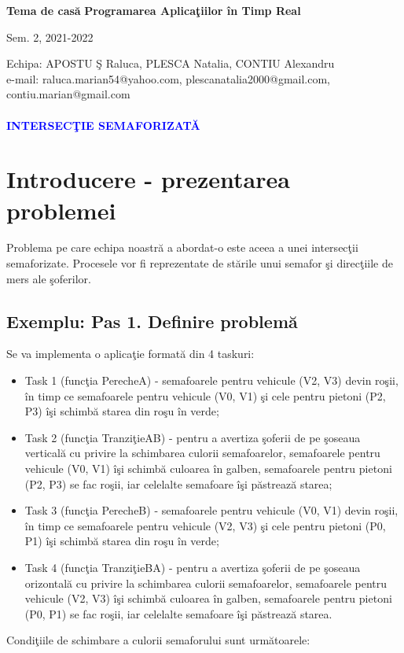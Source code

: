 \documentclass[a4paper, 11pt]{article}
\begin{document}
\noindent
\large\textbf{Tema de cas\u{a}} \hfill \textbf{Programarea Aplica\c{t}iilor \^{i}n Timp Real} 
\begin{flushright} Sem. 2, 2021-2022 \end{flushright} 
\hfill \break
\normalsize Echipa: APOSTU \c{S} Raluca, \space\space\space\space PLESCA Natalia, \space\space\space\space\space CONTIU Alexandru\\
\normalsize e-mail: \space raluca.marian54@yahoo.com, plescanatalia2000@gmail.com, contiu.marian@gmail.com\\
\\
\large\textbf{\textcolor{blue}{INTERSEC\c{T}IE SEMAFORIZAT\u{A}}}

\section{Introducere - prezentarea problemei}
Problema pe care echipa noastr\u{a} a abordat-o este aceea a unei intersec\c{t}ii semaforizate. Procesele vor fi reprezentate de st\u{a}rile unui semafor \c{s}i direc\c{t}iile de mers ale \c{s}oferilor.

\subsection{Exemplu: Pas 1. Definire problem\u{a}}
Se va implementa o aplica\c{t}ie format\u{a} din 4 taskuri:

\begin{itemize}
\item Task 1 (func\c{t}ia PerecheA) - semafoarele pentru vehicule (V2, V3) devin ro\c{s}ii,  \^{i}n timp ce semafoarele pentru vehicule (V0, V1) \c{s}i cele pentru pietoni (P2, P3)  \^{i}\c{s}i schimb\u{a} starea din ro\c{s}u  \^{i}n verde;
\item Task 2 (func\c{t}ia Tranzi\c{t}ieAB) - pentru a avertiza \c{s}oferii de pe \c{s}oseaua vertical\u{a} cu privire la schimbarea culorii semafoarelor, semafoarele pentru vehicule (V0, V1)  \^{i}\c{s}i schimb\u{a} culoarea  \^{i}n galben, semafoarele pentru pietoni (P2, P3) se fac ro\c{s}ii, iar celelalte semafoare  \^{i}\c{s}i p\u{a}streaz\u{a} starea;
\item Task 3 (func\c{t}ia PerecheB) - semafoarele pentru vehicule (V0, V1) devin ro\c{s}ii,  \^{i}n timp ce semafoarele pentru vehicule (V2, V3) \c{s}i cele pentru pietoni (P0, P1)  \^{i}\c{s}i schimb\u{a} starea din ro\c{s}u  \^{i}n verde;
\item Task 4 (func\c{t}ia Tranzi\c{t}ieBA) - pentru a avertiza \c{s}oferii de pe \c{s}oseaua orizontal\u{a} cu privire la schimbarea culorii semafoarelor, semafoarele pentru vehicule (V2, V3)  \^{i}\c{s}i schimb\u{a} culoarea  \^{i}n galben, semafoarele pentru pietoni (P0, P1) se fac ro\c{s}ii, iar celelalte semafoare  \^{i}\c{s}i p\u{a}streaz\u{a} starea.
\end{itemize}
Condi\c{t}iile de schimbare a culorii semaforului sunt urm\u{a}toarele:
\end{document}
